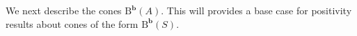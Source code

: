 \documentclass[12pt]{amsart}
\theoremstyle{definition}
\theoremstyle{remark}
\newcommand{\bb}{\mathbf{b}}
\newcommand{\BBQ}{\mathrm{B}}
\begin{document}
%
%
%




We next describe the cones $\BBQ^{\bb}(A)$.
This will provides a base case for positivity results about cones of the form $\BBQ^{\bb}(S)$.
\end{document}
